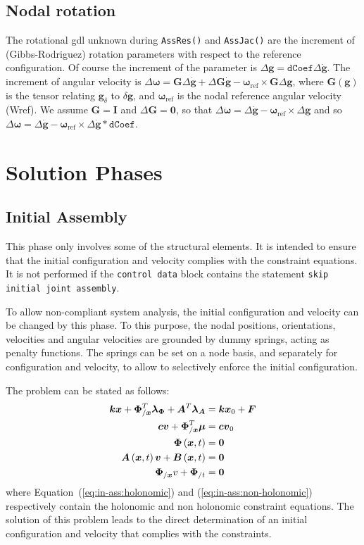\documentclass[10pt,dvips,fleqn]{report}
\newcommand{\T}[1]{\boldsymbol{#1}}
\begin{document}
\section{Nodal rotation}
The rotational gdl unknown during \texttt{AssRes()} and \texttt{AssJac()}
are the increment of (Gibbs-Rodriguez) rotation parameters
with respect to the reference configuration.
Of course the increment of the parameter is
$\Delta \T g=\texttt{dCoef}\Delta \dot{\T g}$.
The increment of angular velocity is 
$\Delta \T \omega = \T G\Delta \dot{\T g}+ \Delta \T G \dot{\T g}-
\T \omega_{\mathrm{ref}}\times \T G \Delta \T g$,
where $\T G(\T g)$ is the tensor relating $\T g_\delta$ to $\delta \T g$,
and $\T \omega_{\mathrm{ref}}$ is the nodal reference angular velocity (Wref).
We assume $\T G = \T I$ and $\Delta \T G = \T 0$,
so that $\Delta \T \omega = \Delta \dot{\T g}-\T \omega_{\mathrm{ref}}\times\Delta \T g$
and so $\Delta \T \omega = \Delta \dot{\T g}-
\T \omega_{\mathrm{ref}}\times\Delta \dot{\T g} * \texttt{dCoef}$.


\chapter{Solution Phases}
\section{Initial Assembly}
This phase only involves some of the structural elements.
It is intended to ensure that the initial configuration and velocity 
complies with the constraint equations.
It is not performed if the \texttt{control data} block contains 
the statement \texttt{skip initial joint assembly}.

To allow non-compliant system analysis, the initial configuration 
and velocity can be changed by this phase.
To this purpose, the nodal positions, orientations, velocities
and angular velocities are grounded by dummy springs, acting 
as penalty functions.
The springs can be set on a node basis, and separately 
for configuration and velocity, to allow to selectively enforce 
the initial configuration.

The problem can be stated as follows:
\begin{align}
	\T{k} \T{x} + \T{\Phi}_{/\T{x}}^T \T{\lambda}_{\T{\Phi}} + \T{A}^T \T{\lambda}_{\T{A}}
		& = \T{k} \T{x}_0 + \T{F} \\
	\T{c} \T{v} + \T{\Phi}_{/\T{x}}^T \T{\mu} & = \T{c} \T{v}_0 \\
	\T{\Phi}\plbr{\T{x}, t} & = \T{0} \label{eq:in-ass:holonomic} \\
	\T{A}\plbr{\T{x}, t} \T{v} + \T{B}\plbr{\T{x}, t} & = \T{0} \label{eq:in-ass:non-holonomic} \\
	\T{\Phi}_{/\T{x}} v + \T{\Phi}_{/t} & = \T{0}
\end{align}
where Equation~(\ref{eq:in-ass:holonomic}) and (\ref{eq:in-ass:non-holonomic})
respectively contain the holonomic and non holonomic constraint equations.
The solution of this problem leads to the direct determination
of an initial configuration and velocity that complies 
with the constraints.
\end{document}
